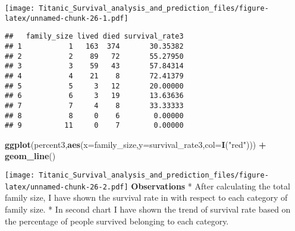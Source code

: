 \documentclass[]{article}
\newenvironment{Shaded}{\begin{snugshade}}{\end{snugshade}}
\newcommand{\KeywordTok}[1]{\textcolor[rgb]{0.13,0.29,0.53}{\textbf{#1}}}
\newcommand{\DataTypeTok}[1]{\textcolor[rgb]{0.13,0.29,0.53}{#1}}
\newcommand{\DecValTok}[1]{\textcolor[rgb]{0.00,0.00,0.81}{#1}}
\newcommand{\StringTok}[1]{\textcolor[rgb]{0.31,0.60,0.02}{#1}}
\newcommand{\OperatorTok}[1]{\textcolor[rgb]{0.81,0.36,0.00}{\textbf{#1}}}
\newcommand{\NormalTok}[1]{#1}
\begin{document}
\texttt{[image: Titanic\_Survival\_analysis\_and\_prediction\_files/figure-latex/unnamed-chunk-26-1.pdf]}

\begin{Shaded}
\end{Shaded}

\begin{verbatim}
##   family_size lived died survival_rate3
## 1           1   163  374       30.35382
## 2           2    89   72       55.27950
## 3           3    59   43       57.84314
## 4           4    21    8       72.41379
## 5           5     3   12       20.00000
## 6           6     3   19       13.63636
## 7           7     4    8       33.33333
## 8           8     0    6        0.00000
## 9          11     0    7        0.00000
\end{verbatim}

\begin{Shaded}
\begin{Highlighting}[]
\KeywordTok{ggplot}\NormalTok{(percent3,}\KeywordTok{aes}\NormalTok{(}\DataTypeTok{x=}\NormalTok{family_size,}\DataTypeTok{y=}\NormalTok{survival_rate3,}\DataTypeTok{col=}\KeywordTok{I}\NormalTok{(}\StringTok{"red"}\NormalTok{))) }\OperatorTok{+}\StringTok{ }\KeywordTok{geom_line}\NormalTok{()}
\end{Highlighting}
\end{Shaded}

\texttt{[image: Titanic\_Survival\_analysis\_and\_prediction\_files/figure-latex/unnamed-chunk-26-2.pdf]}
\textbf{Observations} * After calculating the total family size, I have
shown the survival rate in with respect to each category of family size.
* In second chart I have shown the trend of survival rate based on the
percentage of people survived belonging to each category.
\end{document}
